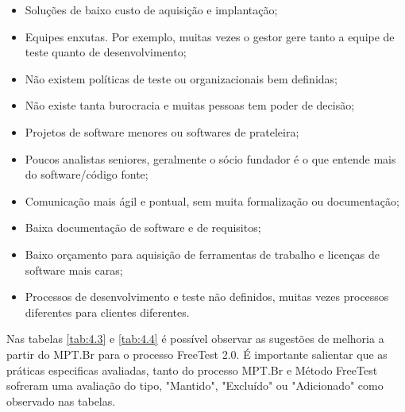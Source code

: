 \begin{itemize}
    \item Soluções de baixo custo de aquisição e implantação;
    \item Equipes enxutas. Por exemplo, muitas vezes o gestor gere tanto a equipe de teste quanto de desenvolvimento;
    \item Não existem políticas de teste ou organizacionais bem definidas;
    \item Não existe tanta burocracia e muitas pessoas tem poder de decisão;
    \item Projetos de software menores ou softwares de prateleira;
    \item Poucos analistas seniores, geralmente o sócio fundador é o que entende mais do software/código fonte;
    \item Comunicação mais ágil e pontual, sem muita formalização ou documentação;
    \item Baixa documentação de software e de requisitos;
    \item Baixo orçamento para aquisição de ferramentas de trabalho e licenças de software mais caras;
    \item Processos de desenvolvimento e teste não definidos, muitas vezes processos diferentes para clientes diferentes.
\end{itemize}

Nas tabelas \ref{tab:4.3} e \ref{tab:4.4} é possível observar as sugestões de melhoria a partir do MPT.Br para o processo FreeTest 2.0. É importante salientar que as práticas especificas avaliadas, tanto do processo MPT.Br e Método FreeTest sofreram uma avaliação do tipo, "Mantido", "Excluído" ou "Adicionado" como observado nas tabelas. 

